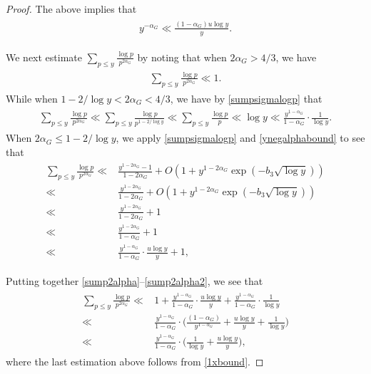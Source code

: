 \documentclass[twoside,leqno,10pt, A4]{amsart}
\begin{document}
\begin{proof}
  The above implies that 
\begin{align}
\label{ynegalphabound}
\begin{split}
 y^{-\alpha_G} \ll  \frac {(1-\alpha_G)u\log y}{y}.
\end{split} 
\end{align}
  
   We next estimate $\sum_{p \leq y}\frac {\log p}{p^{2\alpha_G}}$ by noting that when $2\alpha_G > 4/3$, we have
\begin{align}
\label{sump2alpha}
\begin{split}
 \sum_{p \leq y}\frac {\log p}{p^{2\alpha_G}} \ll 1.
\end{split}
\end{align}      
  While when $1-2/\log y < 2\alpha_G < 4/3$, we have by \eqref{sumpsigmalogp} that
\begin{align}
\label{sump2alpha1}
\begin{split}
 \sum_{p \leq y}\frac {\log p}{p^{2\alpha_G}} \ll \sum_{p \leq y}\frac {\log p}{p^{1-2/\log y}}\ll \sum_{p \leq y}\frac {\log p}{p} \ll \log y \ll \frac {y^{1-\alpha_G}}{1-\alpha_G} \cdot \frac 1{\log y}.
\end{split}
\end{align}    
  When $2\alpha_G  \leq 1-2/\log y$, we apply \eqref{sumpsigmalogp} and \eqref{ynegalphabound} to see that
\begin{align}
\label{sump2alpha2}
\begin{split}
 \sum_{p \leq y}\frac {\log p}{p^{2\alpha_G}} \ll & \frac {y^{1-2\alpha_G}-1}{1-2\alpha_G}+O(1+y^{1-2\alpha_G}\exp(-b_3\sqrt{\log y})) \\
  \ll &  \frac {y^{1-2\alpha_G}}{1-2\alpha_G}+O(1+y^{1-2\alpha_G}\exp(-b_3\sqrt{\log y})) \\
  \ll & \frac {y^{1-2\alpha_G}}{1-2\alpha_G}+1 \\ 
  \ll & \frac {y^{1-2\alpha_G}}{1-\alpha_G}+1 \\
  \ll & \frac {y^{1-\alpha_G}}{1-\alpha_G} \cdot \frac {u\log y}{y}+1, 
\end{split}
\end{align}    
   
  
  Putting together \eqref{sump2alpha}--\eqref{sump2alpha2}, we see that
\begin{align}
\label{sump2alpha3}
\begin{split}
 \sum_{p \leq y}\frac {\log p}{p^{2\alpha_G}} \ll & 1+ \frac {y^{1-\alpha_G}}{1-\alpha_G} \cdot \frac {u\log y}{y}+\frac {y^{1-\alpha_G}}{1-\alpha_G} \cdot \frac 1{\log y} \\
  \ll & \frac {y^{1-\alpha_G}}{1-\alpha_G} \cdot \Big ( \frac {(1-\alpha_G)}{y^{1-\alpha_G}}+ \frac {u\log y}{y}+\frac 1{\log y} \Big ) \\
  \ll & \frac {y^{1-\alpha_G}}{1-\alpha_G} \cdot \Big ( \frac 1{\log y}+ \frac {u\log y}{y}\Big ),
\end{split}
\end{align}    
  where the last estimation above follows from \eqref{1xbound}. 


\end{proof}
\end{document}
